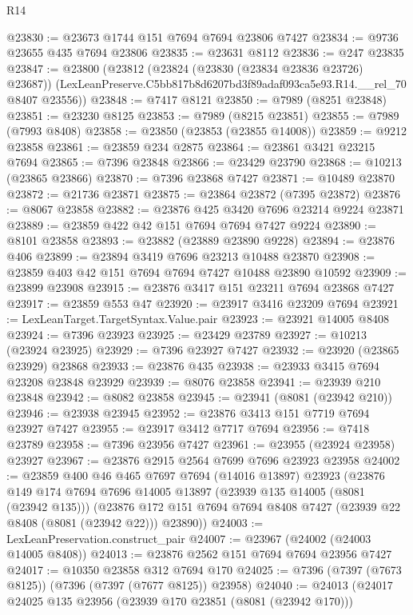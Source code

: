 \begin{lexlean}{R14}
\begin{coremodule}
@23830 := @23673 @1744 @151 @7694 @7694 @23806 @7427
@23834 := @9736 @23655 @435 @7694 @23806
@23835 := @23631 @8112
@23836 := @247 @23835
@23847 := @23800
    (@23812
      (@23824 (@23830 (@23834 @23836 @23726) @23687))
      (LexLeanPreserve.C5bb817b8d6207bd3f89adaf093ca5e93.R14.__rel_70 @8407 @23556))
@23848 := @7417 @8121
@23850 := @7989 (@8251 @23848)
@23851 := @23230 @8125
@23853 := @7989 (@8215 @23851)
@23855 := @7989 (@7993 @8408)
@23858 := @23850 (@23853 (@23855 @14008))
@23859 := @9212 @23858
@23861 := @23859 @234 @2875
@23864 := @23861 @3421 @23215 @7694
@23865 := @7396 @23848
@23866 := @23429 @23790
@23868 := @10213 (@23865 @23866)
@23870 := @7396 @23868 @7427
@23871 := @10489 @23870
@23872 := @21736 @23871
@23875 := @23864 @23872 (@7395 @23872)
@23876 := @8067 @23858
@23882 := @23876 @425 @3420 @7696 @23214 @9224 @23871
@23889 := @23859 @422 @42 @151 @7694 @7694 @7427 @9224
@23890 := @8101 @23858
@23893 := @23882 (@23889 @23890 @9228)
@23894 := @23876 @406
@23899 := @23894 @3419 @7696 @23213 @10488 @23870
@23908 := @23859 @403 @42 @151 @7694 @7694 @7427 @10488 @23890 @10592
@23909 := @23899 @23908
@23915 := @23876 @3417 @151 @23211 @7694 @23868 @7427
@23917 := @23859 @553 @47
@23920 := @23917 @3416 @23209 @7694
@23921 := LexLeanTarget.TargetSyntax.Value.pair
@23923 := @23921 @14005 @8408
@23924 := @7396 @23923
@23925 := @23429 @23789
@23927 := @10213 (@23924 @23925)
@23929 := @7396 @23927 @7427
@23932 := @23920 (@23865 @23929) @23868
@23933 := @23876 @435
@23938 := @23933 @3415 @7694 @23208 @23848 @23929
@23939 := @8076 @23858
@23941 := @23939 @210 @23848
@23942 := @8082 @23858
@23945 := @23941 (@8081 (@23942 @210))
@23946 := @23938 @23945
@23952 := @23876 @3413 @151 @7719 @7694 @23927 @7427
@23955 := @23917 @3412 @7717 @7694
@23956 := @7418 @23789
@23958 := @7396 @23956 @7427
@23961 := @23955 (@23924 @23958) @23927
@23967 := @23876 @2915 @2564 @7699 @7696 @23923 @23958
@24002 := @23859
    @400
    @46
    @465
    @7697
    @7694
    (@14016 @13897)
    @23923
    (@23876
      @149
      @174
      @7694
      @7696
      @14005
      @13897
      (@23939 @135 @14005 (@8081 (@23942 @135)))
      (@23876 @172 @151 @7694 @7694 @8408 @7427 (@23939 @22 @8408 (@8081 (@23942 @22))) @23890))
@24003 := LexLeanPreservation.construct_pair
@24007 := @23967 (@24002 (@24003 @14005 @8408))
@24013 := @23876 @2562 @151 @7694 @7694 @23956 @7427
@24017 := @10350 @23858 @312 @7694 @170
@24025 := @7396 (@7397 (@7673 @8125)) (@7396 (@7397 (@7677 @8125)) @23958)
@24040 := @24013
    (@24017
      @24025
      @135
      @23956
      (@23939 @170 @23851 (@8081 (@23942 @170)))

\end{coremodule}
\end{lexlean}
